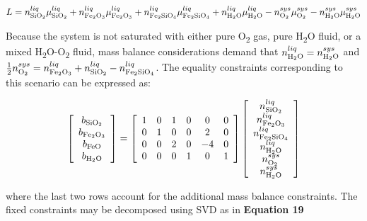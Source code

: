 \documentclass[11pt, titlepage, twoside]{article}
\begin{document}
\begin{MPEquation}[!ht]
\begin{equation}
L = n_{{\rm{Si}}{{\rm{O}}_2}}^{liq}\mu _{{\rm{Si}}{{\rm{O}}_2}}^{liq} + n_{{\rm{F}}{{\rm{e}}_2}{{\rm{O}}_3}}^{liq}\mu _{{\rm{F}}{{\rm{e}}_2}{{\rm{O}}_3}}^{liq} + n_{{\rm{F}}{{\rm{e}}_{\rm{2}}}{\rm{Si}}{{\rm{O}}_4}}^{liq}\mu _{{\rm{F}}{{\rm{e}}_{\rm{2}}}{\rm{Si}}{{\rm{O}}_4}}^{liq} + n_{{{\rm{H}}_2}{\rm{O}}}^{liq}\mu _{{{\rm{H}}_2}{\rm{O}}}^{liq} - n_{{{\rm{O}}_2}}^{sys}\mu _{{{\rm{O}}_2}}^{sys} - n_{{{\rm{H}}_2}{\rm{O}}}^{sys}\mu _{{{\rm{H}}_2}{\rm{O}}}^{sys}
\end{equation}
\label{MPEquationElement:E4CED649-DDCB-4F19-B7EF-28E291C67ADC}
\end{MPEquation}
Because the system is not saturated with either pure O\textsubscript{2} gas, pure H\textsubscript{2}O fluid, or a mixed H\textsubscript{2}O-O\textsubscript{2} fluid, mass balance considerations demand that $n_{{{\rm{H}}_2}{\rm{O}}}^{liq} = n_{{{\rm{H}}_2}{\rm{O}}}^{sys}$ and $\frac{1}{2}n_{{{\rm{O}}_2}}^{sys} = n_{{\rm{F}}{{\rm{e}}_2}{{\rm{O}}_3}}^{liq} + n_{{\rm{Si}}{{\rm{O}}_2}}^{liq} - n_{{\rm{F}}{{\rm{e}}_{\rm{2}}}{\rm{Si}}{{\rm{O}}_4}}^{liq}$. The equality constraints corresponding to this scenario can be expressed as:


\begin{MPEquation}[!ht]
\begin{equation}
\left[ {\begin{array}{*{20}{c}}
{{b_{{\rm{Si}}{{\rm{O}}_{\rm{2}}}}}}\\
{{b_{{\rm{F}}{{\rm{e}}_{\rm{2}}}{{\rm{O}}_{\rm{3}}}}}}\\
{{b_{{\rm{FeO}}}}}\\
{{b_{{{\rm{H}}_{\rm{2}}}{\rm{O}}}}}
\end{array}} \right] = \left[ {\begin{array}{*{20}{c}}
1&0&1&0&0&0\\
0&1&0&0&2&0\\
0&0&2&0&{ - 4}&0\\
0&0&0&1&0&1\\
\end{array}} \right]\left[ {\begin{array}{*{20}{c}}
{n_{{\rm{Si}}{{\rm{O}}_2}}^{liq}}\\
{n_{{\rm{F}}{{\rm{e}}_2}{{\rm{O}}_3}}^{liq}}\\
{n_{{\rm{F}}{{\rm{e}}_2}{\rm{Si}}{{\rm{O}}_4}}^{liq}}\\
{n_{{{\rm{H}}_2}{\rm{O}}}^{liq}}\\
{n_{{{\rm{O}}_2}}^{sys}}\\
{n_{{{\rm{H}}_2}{\rm{O}}}^{sys}}
\end{array}} \right]
\end{equation}
\label{MPEquationElement:846F733B-A2DF-458F-AE04-3E49F065CE4B}
\end{MPEquation}
where the last two rows account for the additional mass balance constraints. The fixed constraints may be decomposed using SVD as in \textbf{Equation 19}
\end{document}
